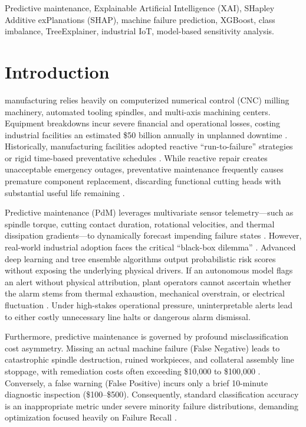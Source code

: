 \documentclass[journal,10pt,twocolumn]{IEEEtran}
\begin{document}
\begin{IEEEkeywords}
Predictive maintenance, Explainable Artificial Intelligence (XAI), SHapley Additive exPlanations (SHAP), machine failure prediction, XGBoost, class imbalance, TreeExplainer, industrial IoT, model-based sensitivity analysis.
\end{IEEEkeywords}

\section{Introduction}
 manufacturing relies heavily on computerized numerical control (CNC) milling machinery, automated tooling spindles, and multi-axis machining centers. Equipment breakdowns incur severe financial and operational losses, costing industrial facilities an estimated \$50 billion annually in unplanned downtime \cite{zonta2020, carvalho2019}. Historically, manufacturing facilities adopted reactive ``run-to-failure'' strategies or rigid time-based preventative schedules \cite{carvalho2019}. While reactive repair creates unacceptable emergency outages, preventative maintenance frequently causes premature component replacement, discarding functional cutting heads with substantial useful life remaining \cite{zonta2020}.

Predictive maintenance (PdM) leverages multivariate sensor telemetry---such as spindle torque, cutting contact duration, rotational velocities, and thermal dissipation gradients---to dynamically forecast impending failure states \cite{matzka2020, dalzochio2020}. However, real-world industrial adoption faces the critical ``black-box dilemma'' \cite{gawde2021, steurtewagen2021}. Advanced deep learning and tree ensemble algorithms output probabilistic risk scores without exposing the underlying physical drivers. If an autonomous model flags an alert without physical attribution, plant operators cannot ascertain whether the alarm stems from thermal exhaustion, mechanical overstrain, or electrical fluctuation \cite{gawde2021}. Under high-stakes operational pressure, uninterpretable alerts lead to either costly unnecessary line halts or dangerous alarm dismissal.

Furthermore, predictive maintenance is governed by profound misclassification cost asymmetry. Missing an actual machine failure (False Negative) leads to catastrophic spindle destruction, ruined workpieces, and collateral assembly line stoppage, with remediation costs often exceeding \$10,000 to \$100,000 \cite{carvalho2019}. Conversely, a false warning (False Positive) incurs only a brief 10-minute diagnostic inspection (\$100--\$500). Consequently, standard classification accuracy is an inappropriate metric under severe minority failure distributions, demanding optimization focused heavily on Failure Recall \cite{steurtewagen2021, lin2025}.
\end{document}
